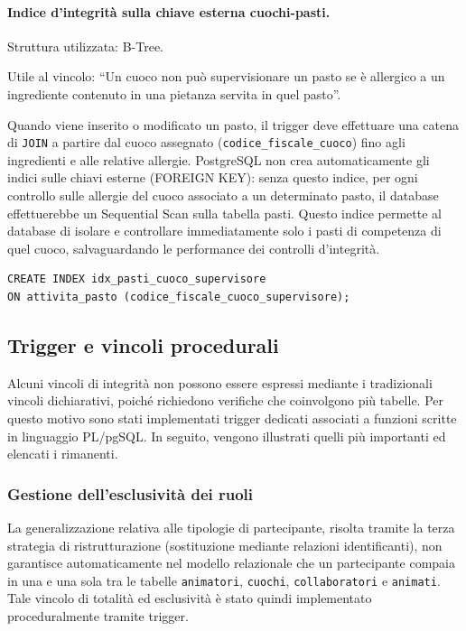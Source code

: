\documentclass[11pt,a4paper]{article}
\begin{document}
\paragraph{Indice d'integrità sulla chiave esterna cuochi-pasti.}
Struttura utilizzata: B-Tree.

Utile al vincolo: ``Un cuoco non può supervisionare un pasto se è allergico a un ingrediente
contenuto in una pietanza servita in quel pasto''.

Quando viene inserito o modificato un pasto, il trigger deve effettuare una catena di \texttt{JOIN} a
partire dal cuoco assegnato (\texttt{codice\_fiscale\_cuoco}) fino agli ingredienti e alle
relative allergie. PostgreSQL non crea automaticamente gli indici sulle chiavi esterne (FOREIGN
KEY): senza questo indice, per ogni controllo sulle allergie del cuoco associato a un
determinato pasto, il database effettuerebbe un Sequential Scan sulla tabella pasti. Questo
indice permette al database di isolare e controllare immediatamente solo i pasti di competenza
di quel cuoco, salvaguardando le performance dei controlli d'integrità.

\begin{verbatim}
CREATE INDEX idx_pasti_cuoco_supervisore
ON attivita_pasto (codice_fiscale_cuoco_supervisore);
\end{verbatim}

\subsection{Trigger e vincoli procedurali}

Alcuni vincoli di integrità non possono essere espressi mediante i tradizionali vincoli
dichiarativi, poiché richiedono verifiche che coinvolgono più tabelle. Per questo motivo sono
stati implementati trigger dedicati associati a funzioni scritte in linguaggio PL/pgSQL. In
seguito, vengono illustrati quelli più importanti ed elencati i rimanenti.

\subsubsection{Gestione dell'esclusività dei ruoli}

La generalizzazione relativa alle tipologie di partecipante, risolta tramite la terza strategia
di ristrutturazione (sostituzione mediante relazioni identificanti), non garantisce
automaticamente nel modello relazionale che un partecipante compaia in una e una sola tra le
tabelle \texttt{animatori}, \texttt{cuochi}, \texttt{collaboratori} e \texttt{animati}. Tale
vincolo di totalità ed esclusività è stato quindi implementato proceduralmente tramite trigger.
\end{document}
